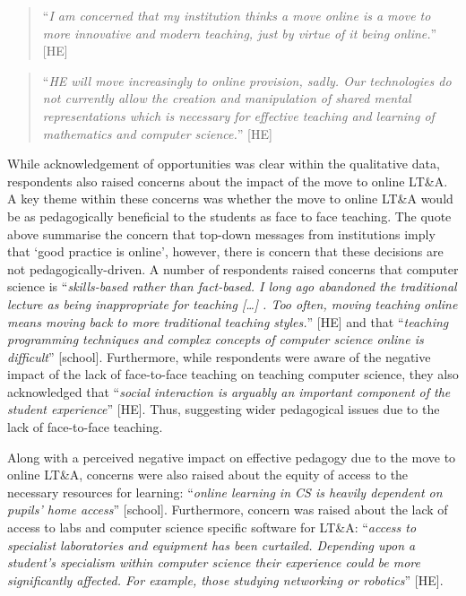 \documentclass[sigconf]{acmart}
\begin{document}
\begin{quotation}
``{\emph{I am concerned that my institution thinks a move online is a
move to more innovative and modern teaching, just by virtue of it
being online.}}'' [HE]
\end{quotation}

\begin{quotation}
``{\emph{HE will move increasingly to online provision, sadly. Our
technologies do not currently allow the creation and manipulation of
shared mental representations which is necessary for effective
teaching and learning of mathematics and computer science.}}'' [HE]
\end{quotation}

While acknowledgement of opportunities was clear within the
qualitative data, respondents also raised concerns about the impact of
the move to online LT\&A. A key theme within these concerns was
whether the move to online LT\&A would be as pedagogically beneficial
to the students as face to face teaching. The quote above summarise
the concern that top-down messages from institutions imply that `good
practice is online', however, there is concern that these decisions
are not pedagogically-driven. A number of respondents raised concerns
that computer science is ``{\emph{skills-based rather than fact-based.
I long ago abandoned the traditional lecture as being inappropriate
for teaching […] .  Too often, moving teaching online means moving
back to more traditional teaching styles.}}” [HE] and that
``{\emph{teaching programming techniques and complex concepts of
computer science online is difficult}}'' [school]. Furthermore, while
respondents were aware of the negative impact of the lack of
face-to-face teaching on teaching computer science, they also
acknowledged that ``{\emph{social interaction is arguably an important
component of the student experience}}'' [HE]. Thus, suggesting wider
pedagogical issues due to the lack of face-to-face teaching.

Along with a perceived negative impact on effective pedagogy due to
the move to online LT\&A, concerns were also raised about the equity
of access to the necessary resources for learning: ``{\emph{online
learning in CS is heavily dependent on pupils' home access}}''
[school]. Furthermore, concern was raised about the lack of access to
labs and computer science specific software for LT\&A: ``{\emph{access
to specialist laboratories and equipment has been curtailed. Depending
upon a student’s specialism within computer science their experience
could be more significantly affected. For example, those studying
networking or robotics}}'' [HE].
\end{document}
